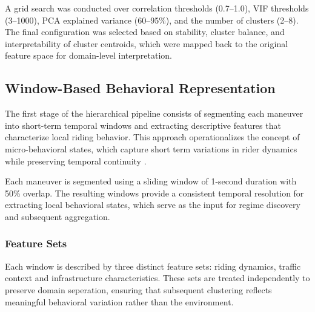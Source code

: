 A grid search was conducted over correlation thresholds (0.7–1.0), VIF thresholds (3–1000), PCA explained variance (60–95\%), and the number of clusters (2–8). The final configuration was selected based on stability, cluster balance, and interpretability of cluster centroids, which were mapped back to the original feature space for domain-level interpretation.



\subsection{Window-Based Behavioral Representation}

The first stage of the hierarchical pipeline consists of segmenting each maneuver into short-term temporal windows and extracting descriptive features that characterize local riding behavior. This approach operationalizes the concept of micro-behavioral states, which capture short term variations in rider dynamics while preserving temporal continuity \cite{li_volatility-based_2025, bachir_identifying_2025, mohammadnazar_classifying_2021}.

Each maneuver is segmented using a sliding window of 1-second duration with 50\% overlap. 
The resulting windows provide a consistent temporal resolution for extracting local behavioral states, which serve as the input for regime discovery and subsequent aggregation.

\subsubsection{Feature Sets}
\label{meth:window-feature-set}

Each window is described by three distinct feature sets: riding dynamics, traffic context and infrastructure characteristics. These sets are treated independently to preserve domain seperation, ensuring that subsequent clustering reflects meaningful behavioral variation rather than the environment.

